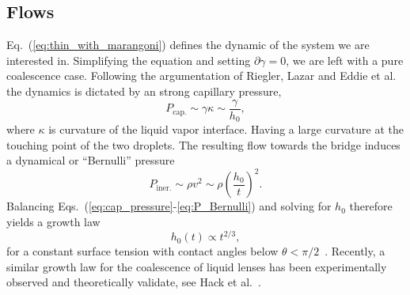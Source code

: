 \documentclass[twocolumn,amsmath,amssymb,showpacs,pre,nofootinbib,superscriptaddress]{revtex4-1} %
\begin{document}
\subsection{Flows}\label{subsec:flows_theory}
Eq.~(\ref{eq:thin_with_marangoni}) defines the dynamic of the system we are interested in.
Simplifying the equation and setting $\partial\gamma = 0$, we are left with a pure coalescence case.
Following the argumentation of Riegler, Lazar and Eddie et al.~\cite{doi:10.1021/la800630w, PhysRevLett.111.144502} the dynamics is dictated by an strong capillary pressure,
\begin{equation}\label{eq:cap_pressure}
    P_{\text{cap.}} \sim\gamma\kappa \sim \frac{\gamma}{h_0},
\end{equation}
where $\kappa$ is curvature of the liquid vapor interface. 
Having a large curvature at the touching point of the two droplets.
The resulting flow towards the bridge induces a dynamical or ``Bernulli'' pressure
\begin{equation}\label{eq:P_Bernulli}
    P_{\text{iner.}} \sim \rho v^2 \sim \rho\left(\frac{h_0}{t}\right)^2.
\end{equation}
Balancing Eqs.~(\ref{eq:cap_pressure}-\ref{eq:P_Bernulli}) and solving for $h_0$ therefore yields a growth law 
\begin{equation}\label{eq:coal_powerlaw}
    h_0(t) \propto t^{2/3},
\end{equation}
for a constant surface tension with contact angles below $\theta < \pi/2$~\cite{PhysRevLett.111.144502, keller2002breaking}.
Recently, a similar growth law for the coalescence of liquid lenses has been experimentally observed and theoretically validate, see Hack et al.~\cite{PhysRevLett.124.194502}.
\end{document}
